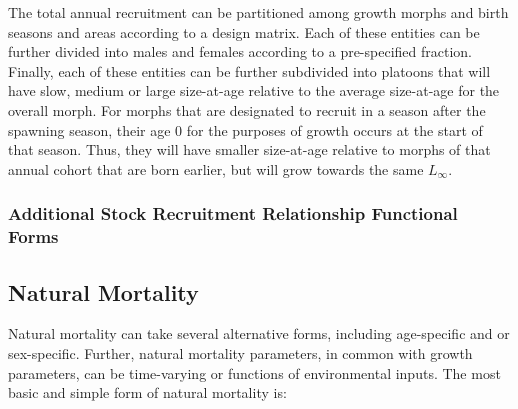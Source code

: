 \documentclass[11pt,
  english,
  letterpaper,
]{article}
\begin{document}
The total annual recruitment can be partitioned among growth morphs and birth seasons and areas according to a design matrix. Each of these entities can be further divided into males and females according to a pre-specified fraction. Finally, each of these entities can be further subdivided into platoons that will have slow, medium or large size-at-age relative to the average size-at-age for the overall morph. For morphs that are designated to recruit in a season after the spawning season, their age 0 for the purposes of growth occurs at the start of that season. Thus, they will have smaller size-at-age relative to morphs of that annual cohort that are born earlier, but will grow towards the same {\(L_\infty\)\leavevmode\tagmcend\tagstructend}.

\leavevmode\tagmcend\tagstructend\par


\hypertarget{additional-stock-recruitment-relationship-functional-forms}{%
\subsubsection{Additional Stock Recruitment Relationship Functional Forms}\label{additional-stock-recruitment-relationship-functional-forms}}

\leavevmode\tagmcend\tagstructend


\hypertarget{natural-mortality}{%
\subsection{Natural Mortality}\label{natural-mortality}}

\leavevmode\tagmcend\tagstructend


Natural mortality can take several alternative forms, including age-specific and or sex-specific. Further, natural mortality parameters, in common with growth parameters, can be time-varying or functions of environmental inputs. The most basic and simple form of natural mortality is:

\leavevmode\tagmcend\tagstructend\par

\end{document}
